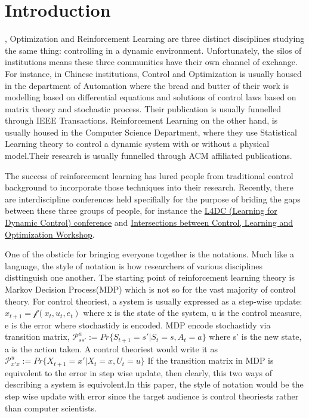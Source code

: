\documentclass[journal]{IEEEtran}
\begin{document}
\section{Introduction}
, Optimization and Reinforcement Learning are three distinct disciplines studying the same thing: controlling in a dynamic environment. Unfortunately, the silos of institutions means these three communities have their own channel of exchange. For instance, in Chinese institutions, Control and Optimization is usually housed in the department of Automation where the bread and butter of their work is modelling based on differential equations and solutions of control laws based on matrix theory and stochastic process. Their publication is usually funnelled through IEEE Transactions. Reinforcement Learning on the other hand, is usually housed in the Computer Science Department, where they use Statistical Learning theory to control a dynamic system with or without a physical model.Their research is usually funnelled through ACM affiliated publications.

The success of reinforcement learning has lured people from traditional control background to incorporate those techniques into their research. Recently, there are interdiscipline conferences held specifially for the purpose of briding the gaps between these three groups of people, for instance the \href{https://l4dc.mit.edu/}{L4DC (Learning for Dynamic Control) conference} and \href{https://www.ipam.ucla.edu/programs/workshops/intersections-between-control-learning-and-optimization/}{Intersections between Control, Learning and Optimization Workshop}.

One of the obsticle for bringing everyone together is the notations. Much like a language, the style of notation is how researchers of various disciplines disttinguish one another. The starting point of reinforcement learning theory is Markov Decision Process(MDP) which is not so for the vast majority of control theory. For control theoriest, a system is usually expressed as a step-wise update: $ x_{t+1} = \mathcal{f}(x_t,u_t,e_t)$ where x is the state of the system, u is the control measure, e is the error where stochastidy is encoded. MDP encode stochastidy via transition matrix,   $ \mathcal{P}_{ss'}^a := Pr\{S_{t+1}=s'|S_{t}=s,A_{t}=a\}$ where s' is the new state, a is the action taken. A control theoriest would write it as $ \mathcal{P}_{x'x}^u := Pr\{X_{t+1}=x'|X_{t}=x, U_{t}=u\}$ If the transition matrix in MDP is equivolent to the error in step wise update, then clearly, this two ways of describing a system is equivolent.In this paper, the style of notation would be the step wise update with error since the target audience is control theoriests rather than computer scientists.
\end{document}
